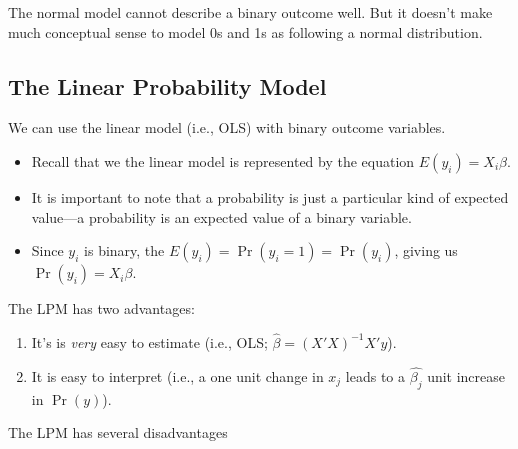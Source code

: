 \documentclass[
]{book}
\providecommand{\tightlist}{%
  \setlength{\itemsep}{0pt}\setlength{\parskip}{0pt}}
\begin{document}
The normal model cannot describe a binary outcome well. But it doesn't
make much conceptual sense to model 0s and 1s as following a normal
distribution.

\hypertarget{the-linear-probability-model}{%
\subsection{The Linear Probability
Model}\label{the-linear-probability-model}}

We can use the linear model (i.e., OLS) with binary outcome variables.

\begin{itemize}
\tightlist
\item
  Recall that we the linear model is represented by the equation
  \(E(y_i) = X_i\beta\).
\item
  It is important to note that a probability is just a particular kind
  of expected value---a probability is an expected value of a binary
  variable.
\item
  Since \(y_i\) is binary, the \(E(y_i) = \Pr(y_i = 1) = \Pr(y_i)\),
  giving us \(\Pr(y_i) = X_i\beta\).
\end{itemize}

The LPM has two advantages:

\begin{enumerate}
\def\labelenumi{\arabic{enumi}.}
\tightlist
\item
  It's is \emph{very} easy to estimate (i.e., OLS;
  \(\hat{\beta} = (X'X)^{-1}X'y\)).
\item
  It is easy to interpret (i.e., a one unit change in \(x_j\) leads to a
  \(\hat{\beta_j}\) unit increase in \(\Pr(y)\)).
\end{enumerate}

The LPM has several disadvantages
\end{document}
